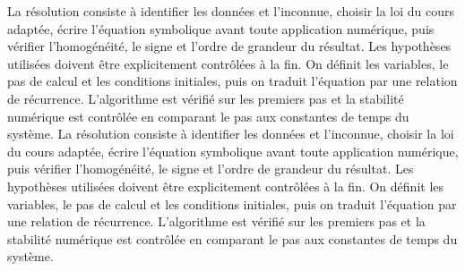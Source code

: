 \begin{corrigebox}[Corrigé]
La résolution consiste à identifier les données et l'inconnue, choisir la loi du cours adaptée, écrire l'équation symbolique avant toute application numérique, puis vérifier l'homogénéité, le signe et l'ordre de grandeur du résultat. Les hypothèses utilisées doivent être explicitement contrôlées à la fin.
On définit les variables, le pas de calcul et les conditions initiales, puis on traduit l'équation par une relation de récurrence. L'algorithme est vérifié sur les premiers pas et la stabilité numérique est contrôlée en comparant le pas aux constantes de temps du système.
La résolution consiste à identifier les données et l'inconnue, choisir la loi du cours adaptée, écrire l'équation symbolique avant toute application numérique, puis vérifier l'homogénéité, le signe et l'ordre de grandeur du résultat. Les hypothèses utilisées doivent être explicitement contrôlées à la fin.
On définit les variables, le pas de calcul et les conditions initiales, puis on traduit l'équation par une relation de récurrence. L'algorithme est vérifié sur les premiers pas et la stabilité numérique est contrôlée en comparant le pas aux constantes de temps du système.
\end{corrigebox}
